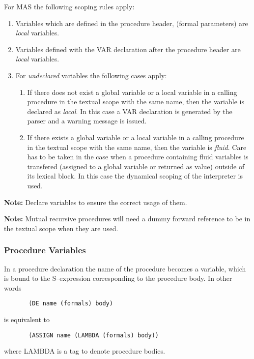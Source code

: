 For MAS the following scoping rules apply:
\begin{enumerate}
\item Variables which are defined in the procedure header,
      (formal parameters) are {\em local} variables. 
\item Variables defined with the VAR declaration after the 
      procedure header are {\em local} variables.
\item For {\em undeclared} variables the following
      cases apply:
      \begin{enumerate}
      \item If there does not exist a global variable 
            or a local variable in a calling procedure 
            in the textual scope with the same name, 
            then the variable is declared as {\em local}.
            In this case a VAR declaration is generated 
            by the parser and a warning message is issued.
      \item If there exists a global variable 
            or a local variable in a calling procedure
            in the textual scope with the same name, 
            then the variable is {\em fluid}.
            Care has to be taken in the case when a procedure 
            containing fluid variables is transfered 
            (assigned to a global variable or returned as value)
            outside of its lexical block. 
            In this case the dynamical scoping of the interpreter 
            is used.
      \end{enumerate}
\end{enumerate}
{\bf Note:} Declare variables to ensure 
the correct usage of them.

{\bf Note:} Mutual recursive procedures will 
need a dummy forward reference to be in the textual scope 
when they are used.


\subsubsection{Procedure Variables}

{\small
In a procedure declaration the name of the
procedure becomes a variable, which is bound to the
S--expression corresponding to the procedure body.
In other words 
\begin{verbatim}
       (DE name (formals) body) 
\end{verbatim}
is equivalent to 
\begin{verbatim}
       (ASSIGN name (LAMBDA (formals) body)) 
\end{verbatim}
where LAMBDA is a tag to denote procedure bodies.
}


